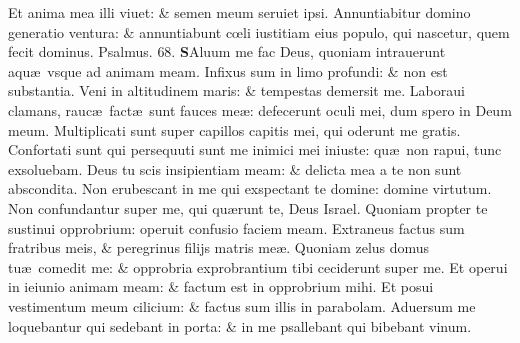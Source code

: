 \documentclass[a5paper,10pt]{book}
\def\ae{æ}
\def\oe{œ}
\begin{document}
\begin{multicols*}{2}
\newline \color{red} E\color{black}t anima mea illi viuet: \& semen meum seruiet ipsi.
\newline \color{red} A\color{black}nnuntiabitur domino generatio ventura: \& annuntiabunt c\oe li iustitiam eius populo, qui nascetur, quem fecit dominus. \quad \color{red} Psalmus. \hypertarget{ps68}{68.} \color{black}
\vspace{-1em}
\lettrine[lines=2]{\bfseries \color{red} S}{}Aluum me fac Deus, quoniam intrauerunt aqu\ae \ vsque ad animam meam.
\newline \color{red} I\color{black}nfixus sum in limo profundi: \& non est substantia.
\newline \color{red} V\color{black}eni in altitudinem maris: \& tempestas demersit me.
\newline \color{red} L\color{black}aboraui clamans, rauc\ae \ fact\ae \ sunt fauces me\ae : defecerunt oculi mei, dum spero in Deum meum.
\newline \color{red} M\color{black}ultiplicati sunt super capillos capitis mei, qui oderunt me gratis.
\newline \color{red} C\color{black}onfortati sunt qui persequuti sunt me inimici mei iniuste: qu\ae \ non rapui, tunc exsoluebam.
\newline \color{red} D\color{black}eus tu scis insipientiam meam: \& delicta mea a te non sunt abscondita.
\newline \color{red} N\color{black}on erubescant in me qui exspectant te domine: domine virtutum.
\newline \color{red} N\color{black}on confundantur super me, qui qu\ae runt te, Deus Israel.
\newline \color{red} Q\color{black}uoniam propter te sustinui opprobrium: operuit confusio faciem meam.
\newline \color{red} E\color{black}xtraneus factus sum fratribus meis, \& peregrinus filijs matris me\ae .
\newline \color{red} Q\color{black}uoniam zelus domus tu\ae \ comedit me: \& opprobria exprobrantium tibi ceciderunt super me.
\newline \color{red} E\color{black}t operui in ieiunio animam meam: \& factum est in opprobrium mihi.
\newline \color{red} E\color{black}t posui vestimentum meum cilicium: \& factus sum illis in parabolam.
\newline \color{red} A\color{black}duersum me loquebantur qui sedebant in porta: \& in me psallebant qui bibebant vinum.

\end{multicols*}
\end{document}
